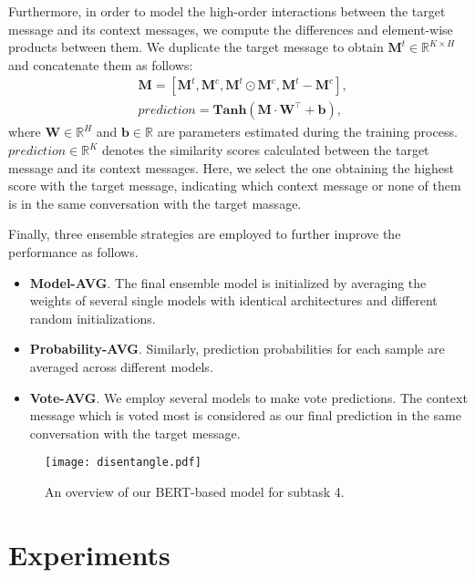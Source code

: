 \documentclass[letterpaper]{article} \usepackage{aaai20}  \usepackage{times}  \usepackage{helvet} \usepackage{courier}  \usepackage[hyphens]{url}  \usepackage{graphicx} \urlstyle{rm} \def\UrlFont{\rm}  \usepackage{graphicx}  \frenchspacing  \setlength{\pdfpagewidth}{8.5in}  \setlength{\pdfpageheight}{11in}
\begin{document}
    Furthermore, in order to model the high-order interactions between the target message and its context messages, we compute the differences and element-wise products between them.
    We duplicate the target message to obtain $\textbf{M}^{t} \in \mathbb{R}^{K\times H}$ and concatenate them as follows:
    \begin{align}
      & \textbf{M} = [\textbf{M}^{t}, \textbf{M}^{c}, \textbf{M}^{t} \odot \textbf{M}^{c}, \textbf{M}^{t} - \textbf{M}^{c}], \\
      & prediction = \textbf{Tanh}(\textbf{M} \cdot \textbf{W}^\top + \textbf{b}),
    \end{align}
    where $\textbf{W} \in \mathbb{R}^{H}$ and $\textbf{b} \in \mathbb{R}$ are parameters estimated during the training process.
    $prediction \in \mathbb{R}^{K}$ denotes the similarity scores calculated between the target message and its context messages.
    Here, we select the one obtaining the highest score with the target message, indicating which context message or none of them is in the same conversation with the target massage.

    Finally, three ensemble strategies are employed to further improve the performance as follows.
    \begin{itemize}
      \item \textbf{Model-AVG}. The final ensemble model is initialized by averaging the weights of several single models with identical architectures and different random initializations.
      \item \textbf{Probability-AVG}. Similarly, prediction probabilities for each sample are averaged across different models.
      \item \textbf{Vote-AVG}. We employ several models to make vote predictions. The context message which is voted most is considered as our final prediction in the same conversation with the target message.
    \end{itemize}



    \begin{figure}
      \texttt{[image: disentangle.pdf]}
      \caption{An overview of our BERT-based model for subtask 4.}
      \label{fig3}
    \end{figure}


\section{Experiments}
\end{document}
